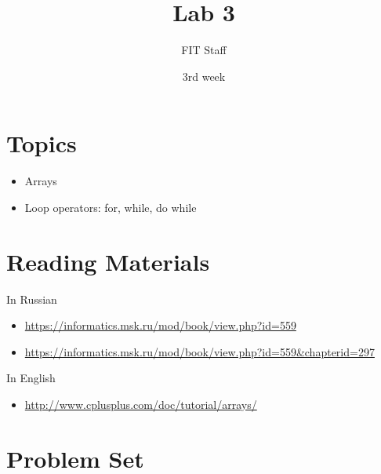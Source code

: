 \documentclass[12pt]{article}
\title{\myfont Lab 3}
\date {\myfont 3rd week}
\author{\myfont FIT Staff}
\begin{document}
    \maketitle

    \section{Topics}
        \begin{itemize}
            \item\large Arrays
            \item Loop operators: for, while, do while
        \end{itemize}

    \section{Reading Materials}
        \large In Russian
        \begin{itemize}
            \item \small \url{https://informatics.msk.ru/mod/book/view.php?id=559}
            \item \small \url{https://informatics.msk.ru/mod/book/view.php?id=559&chapterid=297}
        \end{itemize}
        In English
        \begin{itemize}
            \item \small \url{http://www.cplusplus.com/doc/tutorial/arrays/}
        \end{itemize}

        \section{Problem Set}
        
        
        
        
        
        
        
        
        
        
        
        
        
        
        
        
        
        
        
        
\end{document}
